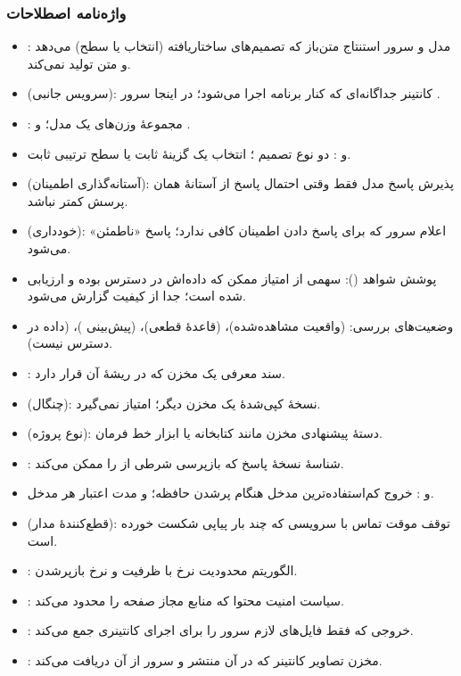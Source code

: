 \documentclass[12pt]{article}
\begin{document}
 \subsubsection{واژه‌نامه اصطلاحات}
\begin{itemize}
\item {}: مدل و سرور استنتاج متن‌باز که تصمیم‌های ساختاریافته (انتخاب یا سطح) می‌دهد و متن تولید نمی‌کند.
\item {} (سرویس جانبی): کانتینر جداگانه‌ای که کنار برنامه اجرا می‌شود؛ در اینجا سرور .
\item {}: مجموعهٔ وزن‌های یک مدل؛  و .
\item {} و : دو نوع تصمیم ؛ انتخاب یک گزینهٔ ثابت یا سطح ترتیبی ثابت.
\item {} (آستانه‌گذاری اطمینان): پذیرش پاسخ مدل فقط وقتی احتمال پاسخ از آستانهٔ همان پرسش کمتر نباشد.
\item {} (خودداری): اعلام سرور که برای پاسخ دادن اطمینان کافی ندارد؛ پاسخ «ناطمئن» می‌شود.
\item پوشش شواهد (): سهمی از امتیاز ممکن که داده‌اش در دسترس بوده و ارزیابی شده است؛ جدا از کیفیت گزارش می‌شود.
\item وضعیت‌های بررسی:  (واقعیت مشاهده‌شده)،  (قاعدهٔ قطعی)،  (پیش‌بینی )،  (داده در دسترس نیست).
\item {}: سند معرفی یک مخزن که در ریشهٔ آن قرار دارد.
\item {} (چنگال): نسخهٔ کپی‌شدهٔ یک مخزن دیگر؛ امتیاز نمی‌گیرد.
\item {} (نوع پروژه): دستهٔ پیشنهادی مخزن مانند کتابخانه یا ابزار خط فرمان.
\item {}: شناسهٔ نسخهٔ پاسخ که بازپرسی شرطی از  را ممکن می‌کند.
\item {} و : خروج کم‌استفاده‌ترین مدخل هنگام پرشدن حافظه؛ و مدت اعتبار هر مدخل.
\item {} (قطع‌کنندهٔ مدار): توقف موقت تماس با سرویسی که چند بار پیاپی شکست خورده است.
\item {}: الگوریتم محدودیت نرخ با ظرفیت و نرخ بازپرشدن.
\item {}: سیاست امنیت محتوا که منابع مجاز صفحه را محدود می‌کند.
\item {}: خروجی  که فقط فایل‌های لازم سرور را برای اجرای کانتینری جمع می‌کند.
\item {}: مخزن تصاویر کانتینر که  در آن منتشر و سرور از آن دریافت می‌کند.

\end{itemize}
\end{document}

